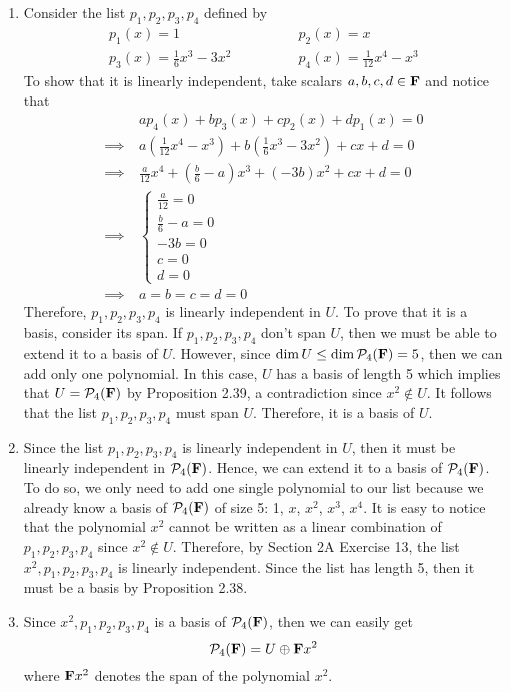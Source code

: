 \begin{solution}
    \begin{enumerate}[label=(\alph*)]
        \item Consider the list $p_1, p_2, p_3, p_4$ defined by
        \begin{align*}
            p_1(x) = 1 \qquad &\qquad p_2(x) = x \\
            p_3(x) = \frac{1}{6}x^3 - 3x^2 \qquad &\qquad p_4(x) = \frac{1}{12}x^4-x^3 
        \end{align*}
        To show that it is linearly independent, take scalars $a,b,c,d \in \mathbf{F}$ and notice that
        \begin{align*}
            &ap_4(x) + bp_3(x) + cp_2(x) + dp_1(x) = 0 \\
            \implies \ & a\left(\frac{1}{12}x^4-x^3\right)  + b\left(\frac{1}{6}x^3-3x^2\right) + cx + d = 0\\
            \implies \ & \frac{a}{12}x^4 + \left(\frac{b}{6} - a\right)x^3 + (-3b)x^2 + cx + d = 0 \\
            \implies \ & \begin{cases}
                \frac{a}{12}=0 \\ \frac{b}{6}-a = 0 \\ - 3b = 0 \\ c = 0 \\ d = 0
            \end{cases} \\
            \implies \ & a=b=c=d=0
        \end{align*}
        Therefore, $p_1, p_2, p_3, p_4$ is linearly independent in $U$. To prove that it is a basis, consider its span. If $p_1, p_2, p_3, p_4$ don't span $U$, then we must be able to extend it to a basis of $U$. However, since $\dim U \leq \dim \mathcal{P}_4(\mathbf{F}) = 5$, then we can add only one polynomial. In this case, $U$ has a basis of length 5 which implies that $U = \mathcal{P}_4(\mathbf{F})$ by Proposition 2.39, a contradiction since $x^2 \notin U$. It follows that the list $p_1, p_2, p_3, p_4$ must span $U$. Therefore, it is a basis of $U$.
        \item Since the list $p_1, p_2, p_3, p_4$ is linearly independent in $U$, then it must be linearly independent in $\mathcal{P}_4(\mathbf{F})$. Hence, we can extend it to a basis of $\mathcal{P}_4(\mathbf{F})$. To do so, we only need to add one single polynomial to our list because we already know a basis of $\mathcal{P}_4(\mathbf{F})$ of size 5: 1, $x$, $x^2$, $x^3$, $x^4$. It is easy to notice that the polynomial $x^2$ cannot be written as a linear combination of $p_1, p_2, p_3, p_4$ since $x^2 \notin U$. Therefore, by Section 2A Exercise 13, the list $x^2, p_1, p_2, p_3, p_4$ is linearly independent. Since the list has length 5, then it must be a basis by Proposition 2.38.
        \item Since $x^2, p_1, p_2, p_3, p_4$ is a basis of $\mathcal{P}_4(\mathbf{F})$, then we can easily get
        $$\mathcal{P}_4(\mathbf{F}) = U \oplus \mathbf{F} x^2$$
        where $\mathbf{F} x^2$ denotes the span of the polynomial $x^2$. \\
    \end{enumerate}
\end{solution}

